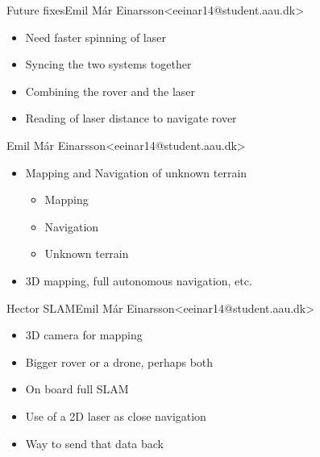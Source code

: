 \begin{frame}{Future fixes}{Emil Már Einarsson\newline<eeinar14@student.aau.dk>}
  \begin{itemize}
  	\item <2-> Need faster spinning of laser
  	\item <3-> Syncing the two systems together 
  	\item <4-> Combining the rover and the laser
  	\item <5-> Reading of laser distance to navigate rover
  \end{itemize}
\end{frame}

\begin{frame}{}{Emil Már Einarsson\newline<eeinar14@student.aau.dk>}
	\begin{itemize}
		\item <2-> Mapping and Navigation of unknown terrain
		\begin{itemize}
			\item <2-> Mapping %
			\item <2-> Navigation %
			\item <2-> Unknown terrain %
		\end{itemize}
		\item <3-> 3D mapping, full autonomous navigation, etc. %
	\end{itemize}
\end{frame}

\begin{frame}{Hector SLAM}{Emil Már Einarsson\newline<eeinar14@student.aau.dk>}
  \begin{itemize}
  	\item <2-> 3D camera for mapping
  	\item <3-> Bigger rover or a drone, perhaps both
  	\item <4-> On board full SLAM
  	\item <5-> Use of a 2D laser as close navigation
  	\item <6-> Way to send that data back
  \end{itemize}
\end{frame}

